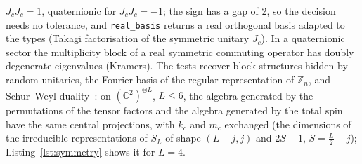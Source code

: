 \documentclass[11pt]{article}
\newcommand{\C}{\mathbb{C}}
\begin{document}
$J_c\overline{J_c}=1$, quaternionic for $J_c\overline{J_c}=-1$; the sign has a gap of 2, so the decision needs no
tolerance, and \texttt{real\_basis} returns a real orthogonal basis adapted to the types (Takagi factorisation of the
symmetric unitary $J_c$). In a quaternionic sector the multiplicity block of a real symmetric commuting operator has
doubly degenerate eigenvalues (Kramers). The tests recover block structures hidden
by random unitaries, the Fourier basis of the regular representation of $\mathbb Z_n$, and Schur--Weyl
duality~\cite{fulton1991}: on $(\C^2)^{\otimes L}$, $L\le6$, the algebra generated by the permutations of the tensor
factors and the algebra generated by the total spin have the same central projections, with $k_c$ and $m_c$
exchanged (the dimensions of the irreducible representations of $S_L$ of shape $(L-j,j)$ and $2S+1$, $S=\frac L2-j$);
Listing~\ref{lst:symmetry} shows it for $L=4$.
\end{document}
